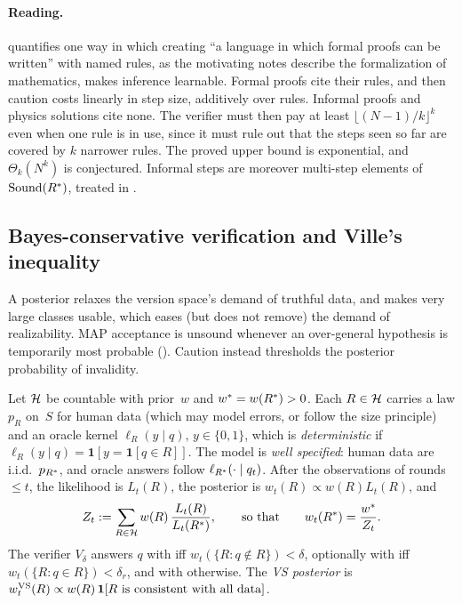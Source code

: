 \paragraph{Reading.}  quantifies one way in which creating ``a language in which formal proofs can be written'' with named rules, as the motivating notes \citep{hanni2026notes} describe the formalization of mathematics, makes inference learnable. Formal proofs cite their rules, and then caution costs linearly in step size, additively over rules. Informal proofs and physics solutions cite none. The verifier must then pay at least $\lfloor(N-1)/k\rfloor^k$ even when one rule is in use, since it must rule out that the steps seen so far are covered by $k$ narrower rules. The proved upper bound is exponential, and $\Theta_k(N^k)$ is conjectured. Informal steps are moreover multi-step elements of $\mathrm{Sound}(R^{*})$, treated in .

\subsection{Bayes-conservative verification and Ville's inequality}\label{sec:caution:bayes}

A posterior relaxes the version space's demand of truthful data, and makes very large classes usable, which eases (but does not remove) the demand of realizability. MAP acceptance is unsound whenever an over-general hypothesis is temporarily most probable (). Caution instead thresholds the posterior probability of invalidity.

\begin{definition}\label{def:caution:bayes}
Let $\mathcal{H}$ be countable with prior~$w$ and $w^{*}=w(R^{*})>0$. Each $R\in\mathcal{H}$ carries a law $p_R$ on~$S$ for human data (which may model errors, or follow the size principle) and an oracle kernel $\ell_R(y\mid q)$, $y\in\{0,1\}$, which is \emph{deterministic} if $\ell_R(y\mid q)=\mathbf 1[y=\mathbf 1[q\in R]]$. The model is \emph{well specified}: human data are i.i.d.\ $p_{R^{*}}$, and oracle answers follow $\ell_{R^{*}}(\cdot\mid q_t)$. After the observations of rounds $\le t$, the likelihood is $L_t(R)$, the posterior is $w_t(R)\propto w(R)L_t(R)$, and
\[
Z_t:=\sum_{R\in\mathcal{H}}w(R)\,\frac{L_t(R)}{L_t(R^{*})},\qquad\text{so that}\qquad w_t(R^{*})=\frac{w^{*}}{Z_t}.
\]
The verifier $V_\delta$ answers $q$ with \ACCEPT{} iff $w_t(\{R:q\notin R\})<\delta$, optionally with \REJECT{} iff $w_t(\{R:q\in R\})<\delta_r$, and with \ESCALATE{} otherwise. The \emph{VS posterior} is $w^{\mathrm{VS}}_t(R)\propto w(R)\,\mathbf 1[R\text{ is consistent with all data}]$.
\end{definition}

